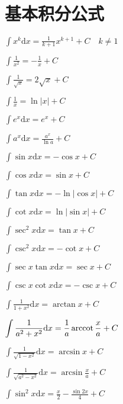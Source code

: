 \section{基本积分公式}

\begin{multicols}{2}
    \begin{spacing}{3}
        \noindent $\displaystyle \int{x^k}\mathrm{d}x = \frac{1}{k+1}x^{k+1} + C \quad k\neq1$

        \noindent $\displaystyle \int{\frac{1}{x^2}} = -\frac{1}{x} + C$

        \noindent $\displaystyle \int{\frac{1}{\sqrt{x}}} = 2\sqrt{x} + C$

        \noindent $\displaystyle \int{\frac{1}{x}} = \ln{\left| x \right|} + C$

        \noindent $\displaystyle \int{e^x}\mathrm{d}x = e^x + C$

        \noindent $\displaystyle \int{a^x}\mathrm{d}x = \frac{a^x}{\ln{a}} + C$

        \noindent $\displaystyle \int{\sin{x}}\mathrm{d}x = -\cos{x} + C$

        \noindent $\displaystyle \int{\cos{x}}\mathrm{d}x = \sin{x} + C$

        \noindent $\displaystyle \int{\tan{x}}\mathrm{d}x = -\ln{\left| \cos{x} \right|} + C$

        \noindent $\displaystyle \int{\cot{x}}\mathrm{d}x = \ln{\left| \sin{x} \right|} + C$

        \noindent $\displaystyle \int{\sec^2{x}}\mathrm{d}x = \tan{x} + C$

        \noindent $\displaystyle \int{\csc^2{x}}\mathrm{d}x = -\cot{x} + C$

        \noindent $\displaystyle \int{\sec{x}\tan{x}}\mathrm{d}x = \sec{x} + C$

        \noindent $\displaystyle \int{\csc{x}\cot{x}}\mathrm{d}x = -\csc{x} + C$

        \noindent $\displaystyle \int{\frac{1}{1 + x^2}}\mathrm{d}x = \arctan{x} + C$

        \noindent $\displaystyle \int{\frac{1}{a^2 + x^2}}\mathrm{d}x = \frac{1}{a}\operatorname{arccot}{\frac{x}{a}} + C$

        \noindent $\displaystyle \int{\frac{1}{\sqrt{1 - x^2}}}\mathrm{d}x = \arcsin{x} + C$

        \noindent $\displaystyle \int{\frac{1}{\sqrt{a^2 - x^2}}}\mathrm{d}x = \arcsin{\frac{x}{a}} + C$

        \noindent $\displaystyle \int{\sin^2{x}}\mathrm{d}x = \frac{x}{2} - \frac{\sin{2x}}{4} + C$


\end{spacing}
\end{multicols}
